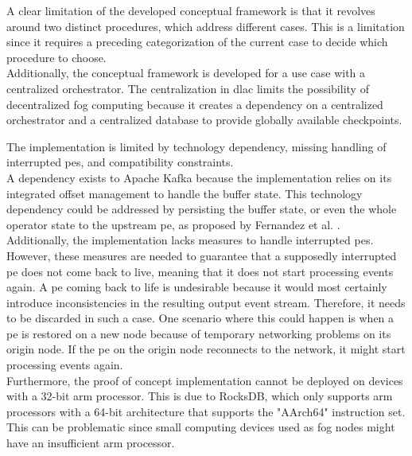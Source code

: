 A clear limitation of the developed conceptual framework is that it revolves around two distinct procedures, which address different cases. This is a limitation since it requires a preceding categorization of the current case to decide which procedure to choose.\\
Additionally, the conceptual framework is developed for a use case with a centralized orchestrator. The centralization in \gls{dlac} limits the possibility of decentralized fog computing because it creates a dependency on a centralized orchestrator and a centralized database to provide globally available checkpoints.\par

The implementation is limited by technology dependency, missing handling of interrupted \gls{pe}s, and compatibility constraints.\\
A dependency exists to Apache Kafka because the implementation relies on its integrated offset management to handle the buffer state. This technology dependency could be addressed by persisting the buffer state, or even the whole operator state to the upstream \gls{pe}, as proposed by Fernandez et al. \cite{CastroFernandez.2013}.\\
Additionally, the implementation lacks measures to handle interrupted \gls{pe}s. However, these measures are needed to guarantee that a supposedly interrupted \gls{pe} does not come back to live, meaning that it does not start processing events again. A \gls{pe} coming back to life is undesirable because it would most certainly introduce inconsistencies in the resulting output event stream. Therefore, it needs to be discarded in such a case. One scenario where this could happen is when a \gls{pe} is restored on a new node because of temporary networking problems on its origin node. If the \gls{pe} on the origin node reconnects to the network, it might start processing events again.\\
Furthermore, the proof of concept implementation cannot be deployed on devices with a 32-bit arm processor. This is due to RocksDB, which only supports arm processors with a 64-bit architecture that supports the "AArch64" instruction set. This can be problematic since small computing devices used as fog nodes might have an insufficient arm processor.\par

